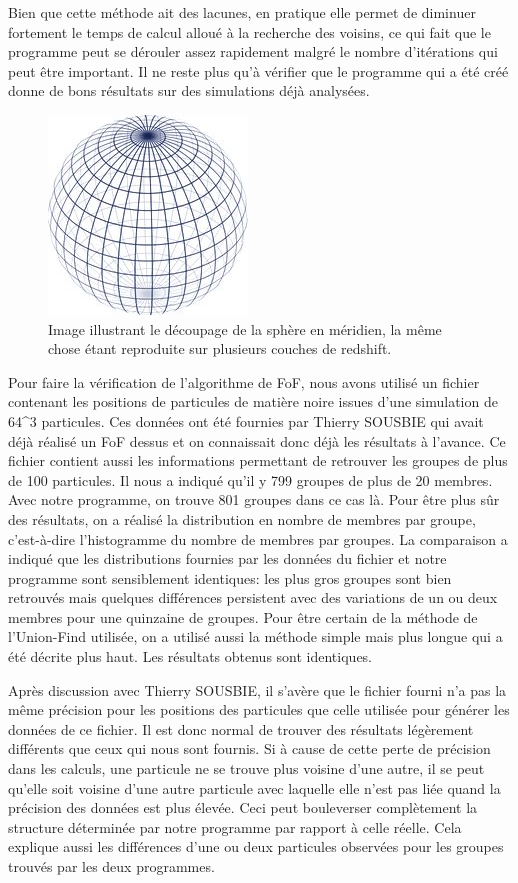 Bien que cette méthode ait des lacunes, en pratique elle permet de diminuer fortement le temps de calcul alloué à la recherche des
voisins, ce qui fait que le programme peut se dérouler assez rapidement malgré le nombre d'itérations qui peut être important. Il
ne reste plus qu'à vérifier que le programme qui a été créé donne de bons résultats sur des simulations déjà analysées.
\begin{figure}[htb]
	\centering
	\includegraphics[width=0.3\linewidth]{sphere.jpg}
	\caption{\footnotesize{}Image illustrant le découpage de la sphère en méridien, la même chose étant
	reproduite sur plusieurs couches de redshift.}
	\label{fig:sphere}
\end{figure}
Pour faire la vérification de l'algorithme de FoF, nous avons utilisé un fichier contenant les positions de particules de matière
noire issues d'une simulation de \num{64^3} particules. Ces données ont été fournies par Thierry SOUSBIE qui avait déjà réalisé un
FoF dessus et on connaissait donc déjà les résultats à l'avance. Ce fichier contient aussi les informations permettant de retrouver
les groupes de plus de \num{100} particules. Il nous a indiqué qu'il y \num{799} groupes de plus de \num{20} membres. Avec notre
programme, on trouve 801 groupes dans ce cas là. Pour être plus sûr des résultats, on a réalisé la distribution en nombre de
membres par groupe, c'est-à-dire l'histogramme du nombre de membres par groupes. La comparaison a indiqué que les distributions
fournies par les données du fichier et notre programme sont sensiblement identiques: les plus gros groupes sont bien retrouvés mais
quelques différences persistent avec des variations de un ou deux membres pour une quinzaine de groupes. Pour être certain de la
méthode de l'Union-Find utilisée, on a utilisé aussi la méthode simple mais plus longue qui a été décrite plus haut. Les résultats
obtenus sont identiques.

Après discussion avec Thierry SOUSBIE, il s'avère que le fichier fourni n'a pas la même précision pour les positions des particules
que celle utilisée pour générer les données de ce fichier. Il est donc normal de trouver des résultats légèrement différents que
ceux qui nous sont fournis. Si à cause de cette perte de précision dans les calculs, une particule ne se trouve plus voisine d'une
autre, il se peut qu'elle soit voisine d'une autre particule avec laquelle elle n'est pas liée quand la précision des données est
plus élevée. Ceci peut bouleverser complètement la structure déterminée par notre programme par rapport à celle réelle. Cela
explique aussi les différences d'une ou deux particules observées pour les groupes trouvés par les deux programmes.

